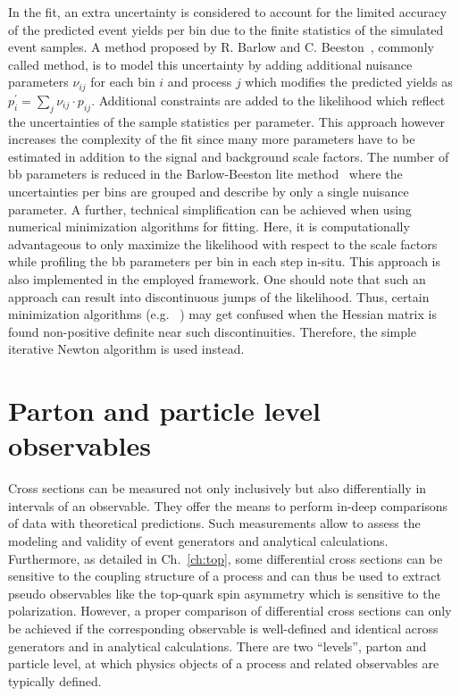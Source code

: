 In the fit, an extra uncertainty is considered to account for the limited accuracy of the predicted event yields per bin due to the finite statistics of the simulated event samples. A method proposed by R. Barlow and C. Beeston~\cite{Barlow:1993dm}, commonly called  method, is to model this uncertainty by adding additional nuisance parameters $\nu_{ij}$ for each bin $i$ and process $j$ which modifies the predicted yields as $p_{i}^\prime=\sum_{j}\nu_{ij}\cdot p_{ij}$. Additional constraints are added to the likelihood which reflect the uncertainties of the sample statistics per parameter. This approach however increases the complexity of the fit since many more parameters have to be estimated in addition to the signal and background scale factors. The number of \gls{bb} parameters is reduced in the Barlow-Beeston lite method~\cite{Conway:2011in} where the uncertainties per bins are grouped and describe by only a single nuisance parameter. A further, technical simplification can be achieved when using numerical minimization algorithms for fitting. Here, it is computationally advantageous to only maximize the likelihood with respect to the scale factors while profiling the \gls{bb} parameters per bin in each step in-situ. This approach is also implemented in the employed \THETA framework. One should note that such an approach can result into discontinuous jumps of the likelihood. Thus, certain minimization algorithms (e.g. \MINUIT~\cite{James:1975dr}) may get confused when the Hessian matrix is found non-positive definite near such discontinuities. Therefore, the simple iterative Newton algorithm is used instead.



\section{Parton and particle level observables}

Cross sections can be measured not only inclusively but also differentially in intervals of an observable. They offer the means to perform in-deep comparisons of data with theoretical predictions. Such measurements allow to assess the modeling and validity of event generators and analytical calculations. Furthermore, as detailed in Ch.~\ref{ch:top}, some differential cross sections can be sensitive to the coupling structure of a process and can thus be used to extract pseudo observables like the top-quark spin asymmetry which is sensitive to the polarization. However, a proper comparison of differential cross sections can only be achieved if the corresponding observable is well-defined and identical across generators and in analytical calculations. There are two ``levels'', parton and particle level, at which physics objects of a process and related observables are typically defined. 

